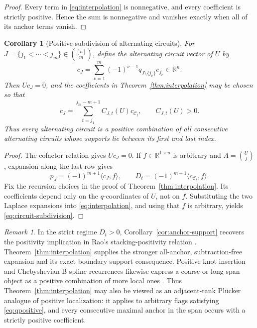 \documentclass{amsart}
\numberwithin{equation}{section}
\newtheorem{corollary}[theorem]{Corollary}
\theoremstyle{definition}
\theoremstyle{remark}
\newtheorem{remark}[theorem]{Remark}
\newcommand{\RR}{\mathbb R}
\newcommand{\cC}{\mathcal C}
\begin{document}
\begin{proof}
Every term in \eqref{eq:interpolation} is nonnegative, and every coefficient is strictly positive.  Hence the sum is nonnegative and vanishes exactly when all of its anchor terms vanish.
\end{proof}


\begin{corollary}[Positive subdivision of alternating circuits]\label{cor:circuit-subdivision}
For $J=\{j_1<\cdots<j_m\}\in\binom{[n]}m$, define the alternating circuit vector of $U$ by
\begin{equation}\label{eq:circuit-vector}
 c_J=\sum_{\nu=1}^m(-1)^{\nu-1}q_{J\setminus\{j_\nu\}}e_{j_\nu}\in\RR^n.
\end{equation}
Then $Uc_J=0$, and the coefficients in Theorem~\ref{thm:interpolation} may be chosen so that
\begin{equation}\label{eq:circuit-subdivision}
 c_J=\sum_{t=j_1}^{j_m-m+1}C_{J,t}(U)c_{\cC_t},
 \qquad C_{J,t}(U)>0.
\end{equation}
Thus every alternating circuit is a positive combination of all consecutive alternating circuits whose supports lie between its first and last index.
\end{corollary}

\begin{proof}
The cofactor relation gives $Uc_J=0$.  If $f\in\RR^{1\times n}$ is arbitrary and $A=\binom{U}{f}$, expansion along the last row gives
\[
 p_J=(-1)^{m+1}\langle c_J,f\rangle,
 \qquad
 D_t=(-1)^{m+1}\langle c_{\cC_t},f\rangle.
\]
Fix the recursion choices in the proof of Theorem~\ref{thm:interpolation}.  Its coefficients depend only on the $q$-coordinates of $U$, not on $f$.  Substituting the two Laplace expansions into \eqref{eq:interpolation}, and using that $f$ is arbitrary, yields \eqref{eq:circuit-subdivision}.
\end{proof}

\begin{remark}\label{rem:spline}
In the strict regime $D_t>0$, Corollary~\ref{cor:anchor-support} recovers the positivity implication in Rao's stacking-positivity relation \cite[Section~5.1]{Rao}.  Theorem~\ref{thm:interpolation} supplies the stronger all-anchor, subtraction-free expansion and its exact boundary support consequence.  Positive knot insertion and Chebyshevian B-spline recurrences likewise express a coarse or long-span object as a positive combination of more local ones \cite{deBoorDeVore,Lyche,Mazure}.  Thus Theorem~\ref{thm:interpolation} may also be viewed as an adjacent-rank Pl\"ucker analogue of positive localization: it applies to arbitrary flags satisfying \eqref{eq:qpositive}, and every consecutive maximal anchor in the span occurs with a strictly positive coefficient.
\end{remark}
\end{document}
